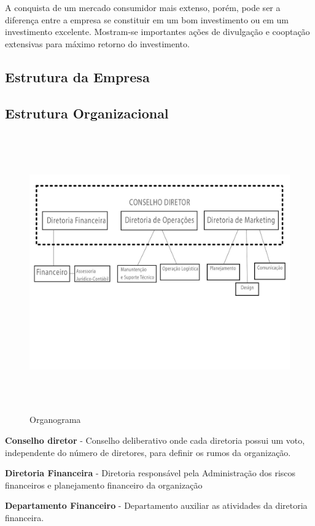 \documentclass[a4paper, 12pt]{paper}
\begin{document}
A conquista de um mercado consumidor mais extenso, porém, pode ser a diferença entre a empresa se constituir em um bom investimento ou em um investimento excelente. Mostram-se importantes ações de divulgação e cooptação extensivas para máximo retorno do investimento.
\newpage
\begin{landscape}
\section{Estrutura da Empresa}
\subsection{Estrutura Organizacional}
    \begin{figure}[!ht]
    	\centering
    	\includegraphics[width=25cm,height=12cm]{img/img09.jpg}
    	\caption{Organograma}
    \end{figure}
\end{landscape}

\textbf{Conselho diretor} - Conselho deliberativo onde cada diretoria possui um voto, independente do n\'{u}mero de diretores, para definir os rumos da organiza\c{c}\~{a}o.

\textbf{Diretoria Financeira} - Diretoria respons\'{a}vel pela Administração dos riscos financeiros e planejamento financeiro da organização

\textbf{Departamento Financeiro} - Departamento auxiliar as atividades da diretoria financeira.
\end{document}
